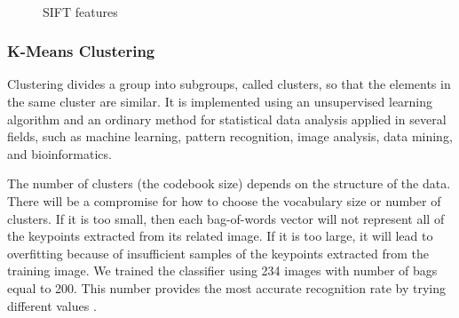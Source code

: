 \documentclass[12pt,fleqn]{book} %
\begin{document}
\begin{figure}[]
\begin{dBox}
\centering
  \mbox{
   }
   \caption{SIFT features \label{fig:sift_example} }   
\end{dBox}   
\end{figure}
\bigskip

\subsubsection{K-Means Clustering} 
Clustering divides a group into subgroups, called clusters, so that the elements in the 
same cluster are similar. It is implemented using an unsupervised learning algorithm and an 
ordinary method for statistical data analysis applied in several fields, such as machine learning, 
pattern recognition, image analysis, data mining, and bioinformatics.
\bigskip

The number of clusters (the codebook size) depends on the structure of 
the data. There will be a compromise for how to choose the vocabulary size or number of 
clusters. If it is too small, then each bag-of-words vector will not represent all of the keypoints 
extracted from its related image. If it is too large, it will lead to overfitting because of insufficient 
samples of the keypoints extracted from the training image. 
We trained the classifier using 234 images with number of bags equal to 200. This number provides the most accurate recognition rate by trying different values \cite{Dardas11}.
\end{document}
